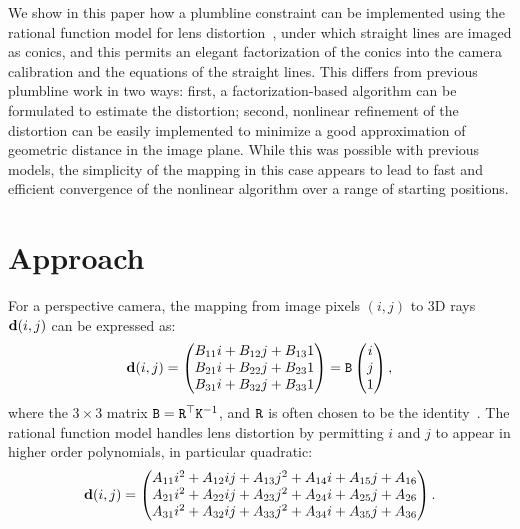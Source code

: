 \documentclass[extendedabs]{bmvc2k}
\begin{document}
We show in this paper how a plumbline constraint can be implemented
using the rational function model for lens
distortion~\cite{Claus05}, under which straight lines are imaged as
conics, and this permits an elegant factorization of the conics
into the camera calibration and the equations of the straight
lines.  This differs from previous plumbline work in two ways:
first, a factorization-based algorithm can be formulated to
estimate the distortion; second, nonlinear refinement of the
distortion can be easily implemented to minimize a good
approximation of geometric distance in the image plane.  While this
was possible with previous models, the simplicity of the mapping in
this case appears to lead to fast and efficient convergence of the
nonlinear algorithm over a range of starting positions.


\section{Approach}
\newcommand{\tr}{^{\top}}
\newcommand{\matx}[1]{\mbox{\tt #1}}
\newcommand{\vect}[1]{{\bf #1}}
For a perspective camera, the mapping from image pixels $(i,j)$ to 3D rays
$\vect d(i,j)$ can be expressed as:
\begin{equation}
\vect d(i,j) = \begin{pmatrix}
B_{11} i   + B_{12}  j + B_{13} 1\\
B_{21} i   + B_{22}  j + B_{23} 1\\
B_{31} i   + B_{32}  j + B_{33} 1
\end{pmatrix}
= \matx B \begin{pmatrix}i\\j\\1\end{pmatrix}, \label{eqn:pinhole}
\end{equation}
where the $3\times3$ matrix $\matx B = \matx R^\top \matx K^{-1}$, and
$\matx R$ is often chosen to be the identity~\cite{Hartley00}.  The
rational function model handles lens distortion by permitting
$i$ and $j$ to appear in higher order polynomials, in particular
quadratic:
\begin{equation}
\vect d(i,j) = \begin{pmatrix}
A_{11} i^2 + A_{12} ij + A_{13} j^2 + A_{14} i + A_{15} j + A_{16}\\
A_{21} i^2 + A_{22} ij + A_{23} j^2 + A_{24} i + A_{25} j + A_{26}\\
A_{31} i^2 + A_{32} ij + A_{33} j^2 + A_{34} i + A_{35} j + A_{36}
           \end{pmatrix}.
           \label{eqn:model}
\end{equation}
\end{document}
